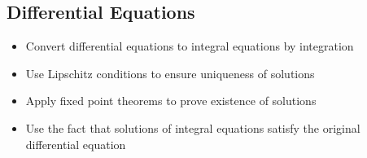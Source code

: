 \subsection*{Differential Equations}
\begin{itemize}
\item Convert differential equations to integral equations by integration
\item Use Lipschitz conditions to ensure uniqueness of solutions
\item Apply fixed point theorems to prove existence of solutions
\item Use the fact that solutions of integral equations satisfy the original differential equation
\end{itemize}
